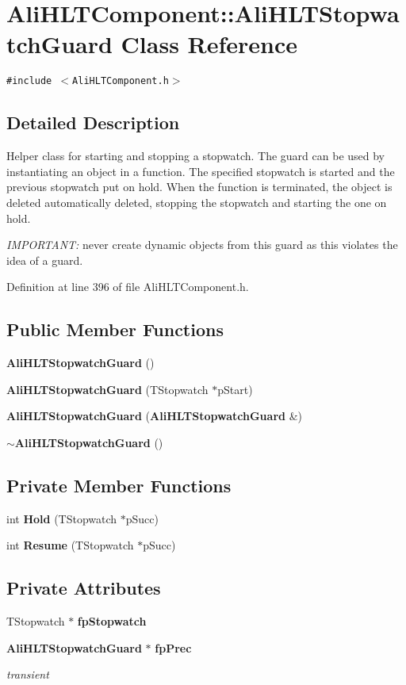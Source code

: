\section{Ali\-HLTComponent::Ali\-HLTStopwatch\-Guard Class Reference}
\label{classAliHLTComponent_1_1AliHLTStopwatchGuard}
{\tt \#include $<$Ali\-HLTComponent.h$>$}



\subsection{Detailed Description}
Helper class for starting and stopping a stopwatch. The guard can be used by instantiating an object in a function. The specified stopwatch is started and the previous stopwatch put on hold. When the function is terminated, the object is deleted automatically deleted, stopping the stopwatch and starting the one on hold.\par
 {\em IMPORTANT:\/} never create dynamic objects from this guard as this violates the idea of a guard. 



Definition at line 396 of file Ali\-HLTComponent.h.\subsection*{Public Member Functions}
\begin{CompactItemize}
\item 
{\bf Ali\-HLTStopwatch\-Guard} ()
\item 
{\bf Ali\-HLTStopwatch\-Guard} (TStopwatch $\ast$p\-Start)
\item 
{\bf Ali\-HLTStopwatch\-Guard} ({\bf Ali\-HLTStopwatch\-Guard} \&)
\item 
{\bf $\sim$Ali\-HLTStopwatch\-Guard} ()
\end{CompactItemize}
\subsection*{Private Member Functions}
\begin{CompactItemize}
\item 
int {\bf Hold} (TStopwatch $\ast$p\-Succ)
\item 
int {\bf Resume} (TStopwatch $\ast$p\-Succ)
\end{CompactItemize}
\subsection*{Private Attributes}
\begin{CompactItemize}
\item 
TStopwatch $\ast$ {\bf fp\-Stopwatch}
\item 
{\bf Ali\-HLTStopwatch\-Guard} $\ast$ {\bf fp\-Prec}
\begin{CompactList}\small\item\em transient \item\end{CompactList}\end{CompactItemize}
